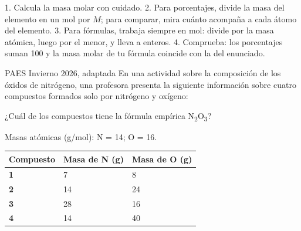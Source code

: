 \begin{clave} 1. Calcula la masa molar con cuidado. 2. Para porcentajes, divide la masa del elemento en un mol por $M$; para comparar, mira cuánto acompaña a cada átomo del elemento. 3. Para fórmulas, trabaja siempre en mol: divide por la masa atómica, luego por el menor, y lleva a enteros. 4. Comprueba: los porcentajes suman 100 y la masa molar de tu fórmula coincide con la del enunciado.\end{clave}
\begin{elejemplo}{PAES Invierno 2026, adaptada}
En una actividad sobre la composición de los óxidos de nitrógeno, una profesora presenta la siguiente información sobre cuatro compuestos formados solo por nitrógeno y oxígeno:

¿Cuál de los compuestos tiene la fórmula empírica N\textsubscript{2}O\textsubscript{3}?

Masas atómicas (g/mol): N = 14; O = 16.
\begin{center}\small
\begin{tabular}{@{}lll@{}}
\toprule
\textbf{Compuesto} & \textbf{Masa de N (g)} & \textbf{Masa de O (g)} \\
\midrule
\textbf{1} & 7 & 8 \\
\textbf{2} & 14 & 24 \\
\textbf{3} & 28 & 16 \\
\textbf{4} & 14 & 40 \\
\bottomrule
\end{tabular}
\end{center}
\end{elejemplo}

